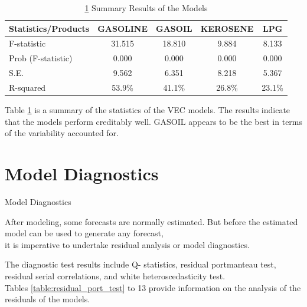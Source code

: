 \documentclass{beamer}
\begin{document}
	\begin{frame}
		\begin{table}
			\caption{ \ref{table:model_summary} Summary Results of the Models}
			\label{table:model_summary}
			\begin{tabular}{lcccc}
				\toprule
				Statistics/Products & GASOLINE & GASOIL & KEROSENE & LPG \\
				\midrule
				
				F-statistic         & 31.515 & 18.810 & 9.884 & 8.133 \\ [10pt]
				Prob (F-statistic)  & 0.000 & 0.000 & 0.000 & 0.000   \\ [10pt]
				S.E.                & 9.562 & 6.351 & 8.218 & 5.367   \\ [10pt]
				R-squared           & 53.9\% & 41.1\% & 26.8\% & 23.1\% \\ [10pt]
				\bottomrule
			\end{tabular}
		\end{table}
	
		\begin{exampleblock}{}
			Table \ref{table:model_summary} is a summary of the statistics of the VEC models. The results indicate that the models perform creditably well. GASOIL appears to be the best in terms of the variability accounted for.
		\end{exampleblock}
	\end{frame}

	
	\section{Model Diagnostics}
	\begin{frame}{Model Diagnostics}
		\begin{block}{}
			After modeling, some forecasts are normally estimated. But before the estimated model can be used to generate any forecast,\\
			it is imperative to undertake residual analysis or model diagnostics.
		\end{block}
		
		\begin{block}{}
			The diagnostic test results include Q- statistics, residual portmanteau test, residual serial correlations, and white heteroscedasticity test. \\
			Tables \ref{table:residual_port_test} to 13 provide information on the analysis of the residuals of the models.
		\end{block}
	\end{frame}
	
\end{document}
